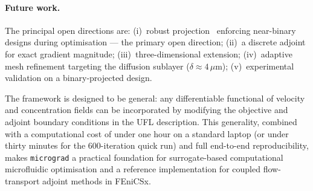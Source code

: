 \paragraph{Future work.}
The principal open directions are:
(i)~robust projection~\cite{wang2011} enforcing near-binary designs
during optimisation --- the primary open direction;
(ii)~a discrete adjoint for exact gradient magnitude;
(iii)~three-dimensional extension;
(iv)~adaptive mesh refinement targeting the diffusion sublayer
($\delta\approx 4\,\mu$m);
(v)~experimental validation on a binary-projected design.

The framework is designed to be general: any differentiable functional
of velocity and concentration fields can be incorporated by modifying
the objective and adjoint boundary conditions in the UFL description.
This generality, combined with a computational cost of under one hour on a standard laptop
(or under thirty minutes for the 600-iteration quick run)
and full end-to-end reproducibility,
makes \texttt{micrograd} a practical foundation for surrogate-based
computational microfluidic optimisation and a reference implementation
for coupled flow-transport adjoint methods in FEniCSx.
